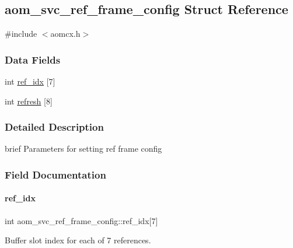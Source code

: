 \hypertarget{structaom__svc__ref__frame__config}{}\subsection{aom\+\_\+svc\+\_\+ref\+\_\+frame\+\_\+config Struct Reference}
\label{structaom__svc__ref__frame__config}


{\ttfamily \#include $<$aomcx.\+h$>$}

\subsubsection*{Data Fields}
\begin{DoxyCompactItemize}
\item 
int \hyperlink{structaom__svc__ref__frame__config_ae6f0dece96f18986127eb6c2ee66c210}{ref\+\_\+idx} \mbox{[}7\mbox{]}
\item 
int \hyperlink{structaom__svc__ref__frame__config_ab2a4596eadeaf5b7730588367918beda}{refresh} \mbox{[}8\mbox{]}
\end{DoxyCompactItemize}


\subsubsection{Detailed Description}
brief Parameters for setting ref frame config 

\subsubsection{Field Documentation}
\mbox{\label{structaom__svc__ref__frame__config_ae6f0dece96f18986127eb6c2ee66c210}} 
\paragraph{\texorpdfstring{ref\+\_\+idx}{ref\_idx}}
{\footnotesize\ttfamily int aom\+\_\+svc\+\_\+ref\+\_\+frame\+\_\+config\+::ref\+\_\+idx\mbox{[}7\mbox{]}}

Buffer slot index for each of 7 references. \mbox{\label{structaom__svc__ref__frame__config_ab2a4596eadeaf5b7730588367918beda}} 

